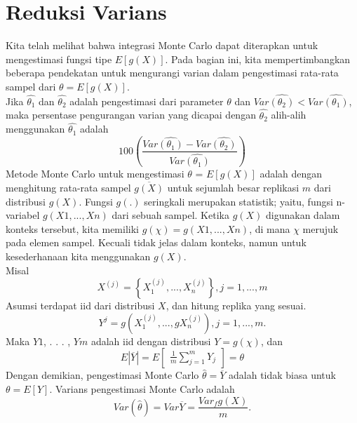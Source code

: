 \documentclass[a4paper,12pt]{article}
\theoremstyle{definition}
\begin{document}
\section{Reduksi Varians}
Kita telah melihat bahwa integrasi Monte Carlo dapat diterapkan untuk mengestimasi fungsi tipe $E[g(X)]$. Pada bagian ini, kita mempertimbangkan beberapa pendekatan untuk mengurangi varian dalam pengestimasi rata-rata sampel dari $\theta=E[g(X)]$.\\
Jika $\hat{\theta_1}$ dan $\hat{\theta_2}$ adalah pengestimasi dari parameter $\theta$ dan $Var\hat{(\theta_2)} < Var\hat{(\theta_1)}$, maka persentase pengurangan varian yang dicapai dengan $\hat{\theta_2}$ alih-alih menggunakan $\hat{\theta_1}$ adalah
\begin{equation}
    100\left ( \frac{Var\hat{(\theta_1)}-Var\hat{(\theta_2)}}{Var\hat{(\theta_1)}} \right )
\end{equation}
Metode Monte Carlo untuk mengestimasi $\theta$ = $E[g(X)]$ adalah dengan menghitung rata-rata sampel $\overline{g(X)}$ untuk sejumlah besar replikasi $m$ dari distribusi $g(X).$ Fungsi $g(.)$ seringkali merupakan statistik; yaitu, fungsi n-variabel $g(X1, . . . ,Xn)$ dari sebuah sampel. Ketika $g(X)$ digunakan dalam konteks tersebut, kita memiliki $g(\chi ) = g(X1, . . . ,Xn)$, di mana $\chi$ merujuk pada elemen sampel. Kecuali tidak jelas dalam konteks, namun untuk kesederhanaan kita menggunakan $g(X)$.\\
Misal
\begin{equation}
    X^{(j)}=\left \{ X_{1}^{(j)}, . . . ,X_{n}^{(j)} \right \}, j=1,. . . ,m
\end{equation}
Asumsi terdapat iid dari distribusi $X$, dan hitung replika yang sesuai.
\begin{equation}
        Y^{j}={g(X_{1}^{(j)}, . . . ,gX_{n}^{(j)})}, j=1,. . . ,m.
        \label{eqn:label2}
\end{equation}
Maka $Y1$, . . . , $Ym$ adalah iid dengan distribusi $Y = g(\chi)$, dan
\begin{equation}
    E|\overline{Y}|=E\begin{bmatrix}
\frac{1}{m}\sum_{j=1}^{m} Y_{j}
\end{bmatrix}=\theta
\end{equation}
Dengan demikian, pengestimasi Monte Carlo $\hat{\theta} = \overline{Y}$ adalah tidak biasa untuk $\theta = E[Y]$. Varians pengestimasi Monte Carlo adalah
\begin{equation}
Var(\hat{\theta})=Var\overline{Y}=\frac{Var_{f}g(X)}{m}.
\end{equation}
\end{document}
